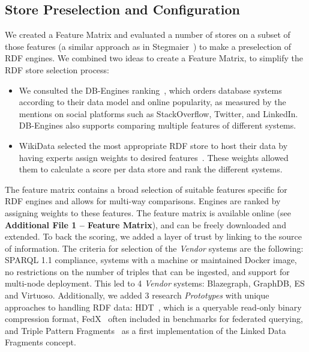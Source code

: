 \documentclass[twocolumn]{bmcart}%
\begin{document}
\subsection{Store Preselection and Configuration}
\label{subsec:featurematrix}
%

We created a Feature Matrix and evaluated a number of stores on a subset of those features (a similar approach as in Stegmaier~\cite{Stegmaier_evaluationof}) to make a preselection of RDF engines.
We combined two ideas to create a Feature Matrix, to simplify the RDF store selection process:
\begin{itemize}
	\item We consulted the DB-Engines ranking~\cite{dbengines}, which orders database systems according to their data model and online popularity, as measured by the mentions on social platforms such as StackOverflow, Twitter, and LinkedIn. 
	DB-Engines also supports comparing multiple features of different systems.
	\item WikiData selected the most appropriate RDF store to host their data by having experts assign weights to desired features~\cite{wikidataranking}.
	These weights allowed them to calculate a score per data store and rank the different systems. 
\end{itemize}

The feature matrix contains a broad selection of suitable features specific for RDF engines and allows for multi-way comparisons. Engines are ranked by assigning weights to these features. 
The feature matrix is available online (see \textbf{Additional File 1 -- Feature Matrix}), and can be freely downloaded and extended. To back the scoring, we added a layer of trust by linking to the source of information.
The criteria for selection of the \emph{Vendor} systems are the following:
SPARQL 1.1 compliance, systems with a machine or maintained Docker image, no restrictions on the number of triples that can be ingested, and support for multi-node deployment.
This led to 4 \emph{Vendor} systems: Blazegraph, GraphDB, ES and Virtuoso.
Additionally, we added 3 research \emph{Prototypes} with unique approaches to handling RDF data: HDT~\cite{DBLP:journals/ws/FernandezMGPA13}, which is a queryable read-only binary compression format, FedX~\cite{DBLP:conf/semweb/SchwarteHHSS11} often included in benchmarks for federated querying, and Triple Pattern Fragments~\cite{DBLP:conf/semweb/VerborghHMHVSCCMW14} as a first implementation of the Linked Data Fragments concept.
\end{document}
